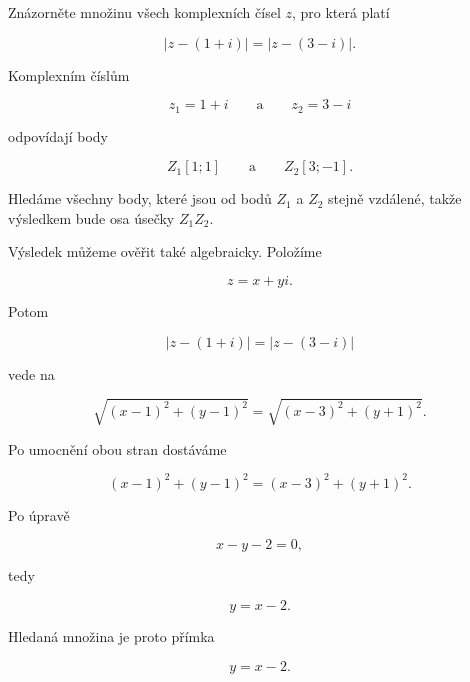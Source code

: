 \documentclass[12pt,a4paper]{article}
\begin{document}
\begin{examplebox}

Znázorněte množinu všech komplexních čísel $z$, pro která platí

\[
    |z-(1+i)|=|z-(3-i)|.
\]

Komplexním číslům

\[
    z_1=1+i
    \qquad\text{a}\qquad
    z_2=3-i
\]

odpovídají body

\[
    Z_1[1;1]
    \qquad\text{a}\qquad
    Z_2[3;-1].
\]

Hledáme všechny body, které jsou od bodů $Z_1$ a $Z_2$ stejně vzdálené, takže
výsledkem bude osa úsečky $Z_1Z_2$.

Výsledek můžeme ověřit také algebraicky. Položíme

\[
    z=x+yi.
\]

Potom

\[
    |z-(1+i)|=|z-(3-i)|
\]

vede na

\[
    \sqrt{(x-1)^2+(y-1)^2}
    =
    \sqrt{(x-3)^2+(y+1)^2}.
\]

Po umocnění obou stran dostáváme

\[
    (x-1)^2+(y-1)^2
    =
    (x-3)^2+(y+1)^2.
\]

Po úpravě

\[
    x-y-2=0,
\]

tedy

\[
    y=x-2.
\]

Hledaná množina je proto přímka

\[
    y=x-2.
\]

\begin{center}
\end{center}

\end{examplebox}
\end{document}
